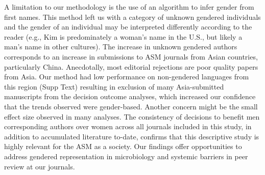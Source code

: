 \documentclass[11pt,]{article}
\begin{document}
A limitation to our methodology is the use of an algorithm to infer
gender from first names. This method left us with a category of unknown
gendered individuals and the gender of an individual may be interpreted
differently according to the reader (e.g., Kim is predominately a
woman's name in the U.S., but likely a man's name in other cultures).
The increase in unknown gendered authors corresponds to an increase in
submissions to ASM journals from Asian countries, particularly China.
Anecdotally, most editorial rejections are poor quality papers from
Asia. Our method had low performance on non-gendered languages from this
region (Supp Text) resulting in exclusion of many Asia-submitted
manuscripts from the decision outcome analyses, which increased our
confidence that the trends observed were gender-based. Another concern
might be the small effect size observed in many analyses. The
consistency of decisions to benefit men corresponding authors over women
across all journals included in this study, in addition to accumulated
literature to-date, confirms that this descriptive study is highly
relevant for the ASM as a society. Our findings offer opportunities to
address gendered representation in microbiology and systemic barriers in
peer review at our journals.
\end{document}
